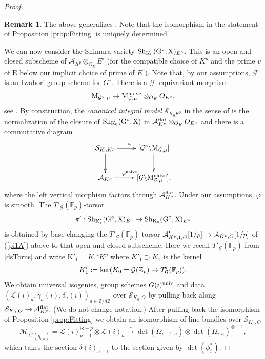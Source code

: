 \documentclass[reqno, 10pt]{amsart}
\makeatletter
\newcommand{\BF}{\ensuremath{\mathbb {F}}\xspace}
\newcommand{\BZ}{\ensuremath{\mathbb {Z}}\xspace}
\newcommand{\CA}{\ensuremath{\mathcal {A}}\xspace}
\newcommand{\CG}{\ensuremath{\mathcal {G}}\xspace}
\newcommand{\CL}{\ensuremath{\mathcal {L}}\xspace}
\newcommand{\CM}{\ensuremath{\mathcal {M}}\xspace}
\newcommand{\CS}{\ensuremath{\mathcal {S}}\xspace}
\newcommand{\RE}{\ensuremath{\mathrm {E}}\xspace}
\newcommand{\RG}{\ensuremath{\mathrm {G}}\xspace}
\newcommand{\RK}{\ensuremath{\mathrm {K}}\xspace}
\newcommand{\RX}{\ensuremath{\mathrm {X}}\xspace}
\newcommand{\bs}{\backslash}
\theoremstyle{definition}
\newtheorem{remark}[subsubsection]{Remark}
\numberwithin{equation}{subsection}
\numberwithin{subsubsection}{subsection}
\renewcommand{\to}{%
   \ifbool{@display}{\longrightarrow}{\rightarrow}%
   }
\newcommand{\Mloc}{{\rm M}}
\makeatother
\begin{document}
\begin{proof}
\begin{remark}\label{rem:SLiuDerived}
The above generalizes \cite[Cor. 5.5]{SLiu}. Note that the isomorphism   in the statement of Proposition \ref{prop:Fitting} is uniquely determined. 
\end{remark}



 

 
 
 

We can now consider the Shimura variety ${\rm Sh}_{\RK_0}(\RG^\circ, \RX)_{E^\circ}$. This is an  open and closed subscheme  of $\CA_{K^p}\otimes_{O_E}E^\circ$ (for the compatible choice of $K^p$ and the prime $v$ of $\RE$ below our implicit choice of prime of $E^\circ$).  
Note that, by our assumptions, $\CG^\circ$ is an Iwahori group scheme 
for $G^\circ$. There is a $\CG^\circ$-equivariant morphism 
\[
\Mloc_{\CG^\circ,\mu}\to \Mloc^{\rm naive}_{\CG,\mu}\otimes_{O_E}O_{E^\circ},
\]
see \cite[p. 215-217]{PZ}. By construction,  the \emph{canonical integral model} $\CS_{K_0K^p }$ in the sense of  \cite{PRg} is the normalization of the closure of ${\rm Sh}_{\RK_0}(\RG^\circ, \RX) $ in $\CA^{\rm flat}_{K^p }\otimes_{O_E}O_{E^\circ}$ and there is a commutative diagram
   \begin{equation}\label{2LM}
\begin{aligned}
 \xymatrix{
      \CS_{K_0K^p} \ar[r]^{\varphi} \ar[d]  &    [\CG^\circ\bs \Mloc_{\CG,\mu}]\ar[d]  \\
       \CA_{K^p}\ar[r]^{\varphi^{\rm naive}} &  [\CG\bs \Mloc^{\rm naive}_{\CG,\mu}],
        }
        \end{aligned}
\end{equation}
where the left vertical morphism factors through $\CA^{\rm flat}_{K^p }$. Under our assumptions,  $\varphi$ is smooth. The 
  $T'_{\CG}(\BF_p)$-torsor   
  \[
 \pi': {\rm Sh}_{\RK'_1 }(\RG^\circ , \RX)_{E^\circ}\to {\rm Sh}_{\RK_0}(\RG^\circ , \RX)_{E^\circ}
 \]
  is obtained by base changing the 
  $T'_{\CG }(\BF_p)$-torsor  $\CA'_{K^p, 1,  O}[1/p]\to \CA_{K^p,O}[1/p]$ of (\ref{pi1A}) above to that open and closed subscheme.
  Here we recall $T'_{\CG }(\BF_p)$ from \eqref{dsTorus} and write  $\RK'_1=K_1'K^p$ where  $K'_1\supset K_1$  is the kernel 
   \[
  K'_1:=\ker(K_0=\CG (\BZ_p)\to T'_{\CG }(\BF_p)).
  \]
 We obtain universal isogenies, group schemes $G(i)^{\rm univ}$   and data 
  $(\CL(i)_a, \gamma_a(i), \delta_a(i))_{a\in \BZ/d\BZ}$ over $\CS_{K_0, O}$ by pulling back along $\CS_{K_0,O}\to \CA^{\rm flat}_{K^p }$. (We do not change notation.) 
 After pulling back the isomorphism of  Proposition \ref{prop:Fitting} we obtain an isomorphism of line bundles over $\CS_{K_0,O}$
 \begin{equation}\label{Fitt2}
 \CM^{-1}_{L^*(\eta_{i,a})} =\CL(i)_{a-1}^{\otimes -p}\otimes \CL(i)_{a} \xrightarrow{\sim} \det(\Omega_{i-1,a})\otimes \det(\Omega_{i,a} )^{\otimes -1} ,
  \end{equation}
 which takes the section $\delta(i)_{a-1}$ to the section given by $\det(\phi^*_i)$.
   

\end{proof}
\end{document}

